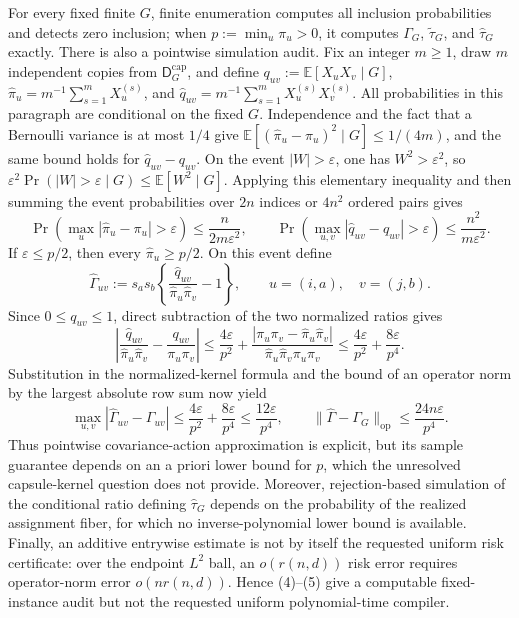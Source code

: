 For every fixed finite \(G\), finite enumeration computes all inclusion probabilities and detects zero inclusion; when \(p:=\min_u\pi_u>0\), it computes \(\Gamma_G\), \(\widetilde\tau_G\), and \(\widehat\tau_G\) exactly.  There is also a pointwise simulation audit.  Fix an integer \(m\ge1\), draw \(m\) independent copies from \(\mathsf D_G^{\mathrm{cap}}\), and define \(q_{uv}:=\mathbb E[X_uX_v\mid G]\), \(\widehat\pi_u=m^{-1}\sum_{s=1}^mX_u^{(s)}\), and \(\widehat q_{uv}=m^{-1}\sum_{s=1}^mX_u^{(s)}X_v^{(s)}\).  All probabilities in this paragraph are conditional on the fixed \(G\).  Independence and the fact that a Bernoulli variance is at most \(1/4\) give \(\mathbb E[(\widehat\pi_u-\pi_u)^2\mid G]\le1/(4m)\), and the same bound holds for \(\widehat q_{uv}-q_{uv}\).  On the event \(|W|>\varepsilon\), one has \(W^2>\varepsilon^2\), so \(\varepsilon^2\Pr(|W|>\varepsilon\mid G)\le\mathbb E[W^2\mid G]\).  Applying this elementary inequality and then summing the event probabilities over \(2n\) indices or \(4n^2\) ordered pairs gives
\[
 \Pr\!\left(\max_u|\widehat\pi_u-\pi_u|>\varepsilon\right)
 \le \frac{n}{2m\varepsilon^2},
 \qquad
 \Pr\!\left(\max_{u,v}|\widehat q_{uv}-q_{uv}|>\varepsilon\right)
 \le \frac{n^2}{m\varepsilon^2}. \tag{4}
\]
If \(\varepsilon\le p/2\), then every \(\widehat\pi_u\ge p/2\).  On this event define
\[
 \widehat\Gamma_{uv}
 :=s_as_b\left\{\frac{\widehat q_{uv}}
 {\widehat\pi_u\widehat\pi_v}-1\right\},
 \qquad u=(i,a),\quad v=(j,b).
\]
Since \(0\le q_{uv}\le1\), direct subtraction of the two normalized ratios gives
\[
 \left|\frac{\widehat q_{uv}}{\widehat\pi_u\widehat\pi_v}
       -\frac{q_{uv}}{\pi_u\pi_v}\right|
 \le \frac{4\varepsilon}{p^2}
 +\frac{|\pi_u\pi_v-\widehat\pi_u\widehat\pi_v|}
 {\widehat\pi_u\widehat\pi_v\pi_u\pi_v}
 \le \frac{4\varepsilon}{p^2}+\frac{8\varepsilon}{p^4}.
\]
Substitution in the normalized-kernel formula and the bound of an operator norm by the largest absolute row sum now yield
\[
 \max_{u,v}|\widehat\Gamma_{uv}-\Gamma_{uv}|
 \le \frac{4\varepsilon}{p^2}+\frac{8\varepsilon}{p^4}
 \le \frac{12\varepsilon}{p^4},
 \qquad
 \|\widehat\Gamma-\Gamma_G\|_{\mathrm{op}}
 \le \frac{24n\varepsilon}{p^4}. \tag{5}
\]
Thus pointwise covariance-action approximation is explicit, but its sample guarantee depends on an a priori lower bound for \(p\), which the unresolved capsule-kernel question does not provide.  Moreover, rejection-based simulation of the conditional ratio defining \(\widehat\tau_G\) depends on the probability of the realized assignment fiber, for which no inverse-polynomial lower bound is available.  Finally, an additive entrywise estimate is not by itself the requested uniform risk certificate: over the endpoint \(L^2\) ball, an \(o(r(n,d))\) risk error requires operator-norm error \(o(nr(n,d))\).  Hence (4)--(5) give a computable fixed-instance audit but not the requested uniform polynomial-time compiler.
